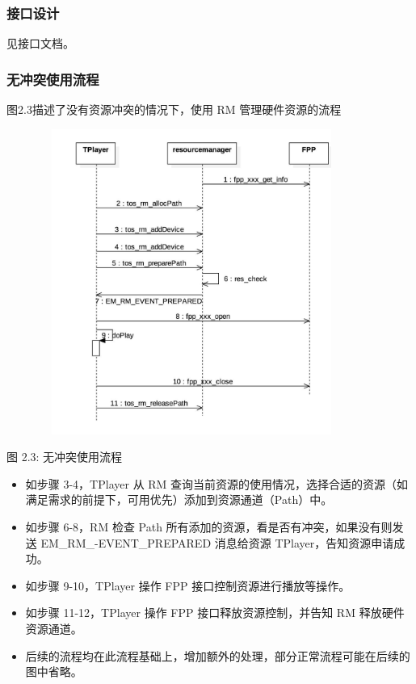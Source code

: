 \documentclass[UTF8]{ctexart}
\begin{document}
\subsubsection{接口设计}
    见接口文档。
\subsubsection{无冲突使用流程}
      图2.3描述了没有资源冲突的情况下，使用 RM 管理硬件资源的流程
\begin{figure}[h]
\centering
\includegraphics[width=10cm,height=10cm]{3.png}
\end{figure}

\centerline{{图 2.3: 无冲突使用流程}}
\begin{itemize}
\item 如步骤 3-4，TPlayer 从 RM 查询当前资源的使用情况，选择合适的资源（如满足需求的前提下，可用优先）添加到资源通道（Path）中。
\item 如步骤 6-8，RM 检查 Path 所有添加的资源，看是否有冲突，如果没有则发送 EM\_RM\_-EVENT\_PREPARED 消息给资源 TPlayer，告知资源申请成功。 
\item 如步骤 9-10，TPlayer 操作 FPP 接口控制资源进行播放等操作。
\item 如步骤 11-12，TPlayer 操作 FPP 接口释放资源控制，并告知 RM 释放硬件资源通道。
\item 后续的流程均在此流程基础上，增加额外的处理，部分正常流程可能在后续的图中省略。
\end{itemize}
\end{document}
